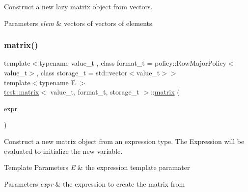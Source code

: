 Construct a new lazy matrix object from vectors. 


\begin{DoxyParams}{Parameters}
{\em elem} & vectors of vectors of elements. \\
\hline
\end{DoxyParams}
\mbox{\label{classtest_1_1matrix_a8ff0fb4c772493b77b89ad49e09673ea}} 
\subsubsection{\texorpdfstring{matrix()}{matrix()}\hspace{0.1cm}{\footnotesize\ttfamily [4/4]}}
{\footnotesize\ttfamily template$<$typename value\+\_\+t , class format\+\_\+t  = policy\+::\+Row\+Major\+Policy$<$value\+\_\+t$>$, class storage\+\_\+t  = std\+::vector$<$value\+\_\+t$>$$>$ \\
template$<$typename E $>$ \\
\mbox{\hyperlink{classtest_1_1matrix}{test\+::matrix}}$<$ value\+\_\+t, format\+\_\+t, storage\+\_\+t $>$\+::\mbox{\hyperlink{classtest_1_1matrix}{matrix}} (\begin{DoxyParamCaption}\item[{\mbox{\hyperlink{classtest_1_1expression}{expression}}$<$ E $>$ const \&}]{expr }\end{DoxyParamCaption})\hspace{0.3cm}{\ttfamily [inline]}}



Construct a new matrix object from an expression type. The Expression will be evaluated to initialize the new variable. 


\begin{DoxyTemplParams}{Template Parameters}
{\em E} & the expression template paramater \\
\hline
\end{DoxyTemplParams}

\begin{DoxyParams}{Parameters}
{\em expr} & the expression to create the matrix from \\
\hline
\end{DoxyParams}


